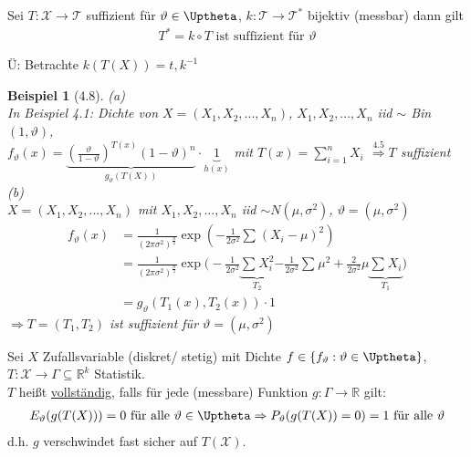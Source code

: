 \documentclass[a4paper,openany]{book}
\theoremstyle{mytheoremstyle}
\newtheorem*{bei}{Beispiel}
\theoremstyle{mytheoremstyle2}
\newtheorem*{cbew}{Beweis}
\newenvironment{bew}[1][]{%
  \ifthenelse{\boolean{showbew}}{%
    \begin{cbew}[#1]%
  }{%
    \expandafter\comment%
  }%
}{%
  \ifthenelse{\boolean{showbew}}{%
    \end{cbew}%
  }{%
    \expandafter\endcomment%
  }%
}
\begin{document}
\begin{lem}{4.7}{}
  Sei $T:\mathcal{X}\to \mathcal{T}$ suffizient für $\vartheta \in \Uptheta$, $k:\mathcal{T}\to \mathcal{T}^*$ bijektiv (messbar) dann gilt 
  \begin{align*}
    T^*=k \circ T \text{ ist suffizient für }\vartheta 
  \end{align*}
\end{lem}
\begin{bew}[]
  Ü: Betrachte $k(T(X))=t, k ^{-1}$ 
\end{bew}
\begin{bei}[4.8]
  (a) \\
  In Beispiel 4.1: Dichte von $X=(X_1,X_2,...,X_n )$, $X_1,X_2,...,X_n $ iid $\sim$ Bin$(1,\vartheta )$,\\
  $f _{\vartheta }(x)=\underbrace{\left(\frac{\vartheta }{1-\vartheta }\right)^{T(x)}(1-\vartheta )^n}_{g _{\vartheta }(T(X))}\cdot \underbrace{1}_{h(x)}$ mit $T(x)=\sum_{i=1}^{n}{X_i}$  $\overset{4.5}\Rightarrow T$ suffizient\\
  (b) \\
  $X=(X_1,X_2,...,X_n )$ mit $X_1,X_2,...,X_n $ iid $\sim N(\mu ,\sigma ^2)$, $\vartheta =(\mu ,\sigma ^2)$
  \begin{align*}
    f _{\vartheta }(x)
    &=\frac{1}{(2 \pi \sigma ^2)^{\frac{n}{2}}}\exp \left(-\frac{1}{2 \sigma ^2} \sum_{}^{}{(X_i-\mu )^2}\right) \\
    &=\frac{1}{(2 \pi \sigma ^2)^{\frac{n}{2}}}\exp \bigg(-\frac{1}{2 \sigma ^2} \underbrace{\sum_{}^{}{X_i^2}}_{T_2}{-\frac{1}{2 \sigma ^2} \sum_{}^{}{\mu ^2}+\frac{2}{2 \sigma ^2}\mu} \underbrace{\sum_{}^{}{X_i}}_{T_1}\bigg) \\
    &=g _{\vartheta }(T_1(x),T_2(x))\cdot 1
  \end{align*}
  $\Rightarrow T=(T_1,T_2)$ ist suffizient für $\vartheta =(\mu ,\sigma ^2)$  
 
\end{bei}
\begin{defi}{4.9}{}
  Sei $X$ Zufallsvariable (diskret/ stetig) mit Dichte $f \in \left\{f _{\vartheta }:\vartheta \in \Uptheta\right\}$, $T:\mathcal{X}\to \Gamma \subseteq \mathbb{R}^k$ Statistik. \\
  $T$ heißt \underline{vollständig}, falls für jede (messbare) Funktion $g:\Gamma \to \mathbb{R}$ gilt:
  \begin{align*}
    E _{\vartheta }(g(T(X)))=0 \text{ für alle }\vartheta \in \Uptheta \Rightarrow P _{\vartheta }(g(T(X))=0)=1 \text{ für alle }\vartheta 
  \end{align*}
  d.h. $g$ verschwindet fast sicher auf $T(\mathcal{X})$.   
\end{defi}
\end{document}

